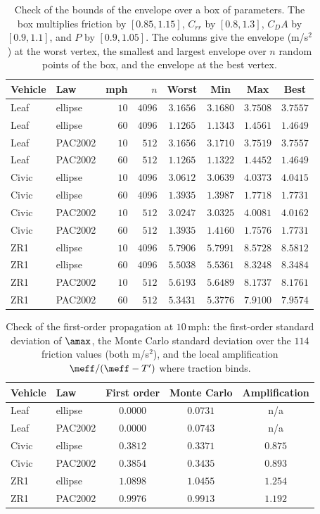 \begin{table}[htbp]
\centering\small
\caption{Check of the bounds of the envelope over a box of parameters. The box multiplies friction by $[0.85,1.15]$, $C_{rr}$ by $[0.8,1.3]$, $C_DA$ by $[0.9,1.1]$, and $P$ by $[0.9,1.05]$. The columns give the envelope (m/s$^2$) at the worst vertex, the smallest and largest envelope over $n$ random points of the box, and the envelope at the best vertex.}\label{tab:app-box}
\begin{tabular}{llrrcccc}
\toprule
Vehicle & Law & mph & $n$ & Worst & Min & Max & Best\\
\midrule
Leaf & ellipse & $10$ & $4096$ & $3.1656$ & $3.1680$ & $3.7508$ & $3.7557$\\
Leaf & ellipse & $60$ & $4096$ & $1.1265$ & $1.1343$ & $1.4561$ & $1.4649$\\
Leaf & PAC2002 & $10$ & $512$ & $3.1656$ & $3.1710$ & $3.7519$ & $3.7557$\\
Leaf & PAC2002 & $60$ & $512$ & $1.1265$ & $1.1322$ & $1.4452$ & $1.4649$\\
Civic & ellipse & $10$ & $4096$ & $3.0612$ & $3.0639$ & $4.0373$ & $4.0415$\\
Civic & ellipse & $60$ & $4096$ & $1.3935$ & $1.3987$ & $1.7718$ & $1.7731$\\
Civic & PAC2002 & $10$ & $512$ & $3.0247$ & $3.0325$ & $4.0081$ & $4.0162$\\
Civic & PAC2002 & $60$ & $512$ & $1.3935$ & $1.4160$ & $1.7576$ & $1.7731$\\
ZR1 & ellipse & $10$ & $4096$ & $5.7906$ & $5.7991$ & $8.5728$ & $8.5812$\\
ZR1 & ellipse & $60$ & $4096$ & $5.5038$ & $5.5361$ & $8.3248$ & $8.3484$\\
ZR1 & PAC2002 & $10$ & $512$ & $5.6193$ & $5.6489$ & $8.1737$ & $8.1761$\\
ZR1 & PAC2002 & $60$ & $512$ & $5.3431$ & $5.3776$ & $7.9100$ & $7.9574$\\
\bottomrule
\end{tabular}
\end{table}

\begin{table}[htbp]
\centering\small
\caption{Check of the first-order propagation at $10$\,mph: the first-order standard deviation of $\amax$, the Monte Carlo standard deviation over the $114$ friction values (both m/s$^2$), and the local amplification $\meff/(\meff-T')$ where traction binds.}\label{tab:app-first}
\begin{tabular}{llccc}
\toprule
Vehicle & Law & First order & Monte Carlo & Amplification\\
\midrule
Leaf & ellipse & $0.0000$ & $0.0731$ & n/a\\
Leaf & PAC2002 & $0.0000$ & $0.0743$ & n/a\\
Civic & ellipse & $0.3812$ & $0.3371$ & $0.875$\\
Civic & PAC2002 & $0.3854$ & $0.3435$ & $0.893$\\
ZR1 & ellipse & $1.0898$ & $1.0455$ & $1.254$\\
ZR1 & PAC2002 & $0.9976$ & $0.9913$ & $1.192$\\
\bottomrule
\end{tabular}
\end{table}
